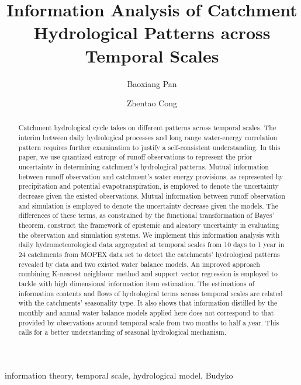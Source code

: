 \documentclass[review]{elsarticle}
\begin{document}
\begin{frontmatter}

\title{Information Analysis of Catchment Hydrological Patterns across Temporal Scales}
 
 

\author[mymainaddress]{Baoxiang Pan}

\author[mymainaddress]{Zhentao Cong}

\address[mymainaddress]{Institute of Hydrology and Water Resources, Tsinghua University, Beijing}
 

 
\begin{abstract}
Catchment hydrological cycle takes on different patterns across temporal scales. The interim between daily hydrological processes and long range water-energy correlation pattern requires further examination to justify a self-consistent understanding. In this paper, we use quantized entropy of runoff observations to represent the prior uncertainty in determining catchment's hydrological patterns. Mutual information between runoff observation and catchment's water energy provisions, as represented by precipitation and potential evapotranspiration, is employed to denote the uncertainty decrease given the existed observations. Mutual information between runoff observation and simulation is employed to denote the uncertainty decrease given the models. The differences of these terms, as constrained by the functional transformation of Bayes' theorem, construct the framework of epistemic and aleatory uncertainty in evaluating the observation and simulation systems.  We implement this information analysis with daily hydrometeorological data aggregated at temporal scales from 10 days to 1 year in 24 catchments from  MOPEX data set to detect the catchments' hydrological patterns revealed by data and two existed water balance models.  An improved approach combining K-nearest neighbour method and  support vector regression is employed to tackle with high dimensional information item estimation. The estimations of information contents and flows of hydrological terms across temporal scales are related with the catchments' seasonality type. It also shows that information distilled by the monthly and annual water balance models applied here does not correspond to that provided by observations around temporal scale from two months to half a year. This calls for a better understanding of seasonal hydrological mechanism.
\end{abstract}

\begin{keyword}
information theory, temporal scale, hydrological model, Budyko 
\end{keyword}

\end{frontmatter}
\end{document}
